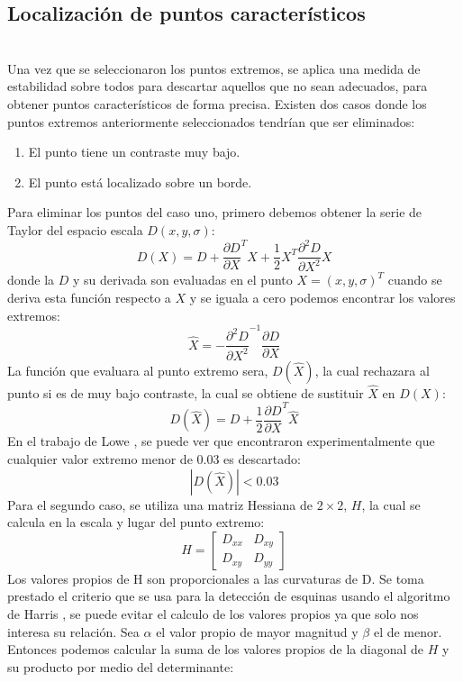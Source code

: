 	
	
	
	\subsection{Localización de puntos característicos} \hfill \\  %
		Una vez que se seleccionaron los puntos extremos, se aplica una medida de estabilidad sobre todos para descartar aquellos que no sean adecuados, para obtener puntos  característicos de forma precisa. Existen dos casos donde los puntos extremos anteriormente seleccionados tendrían que ser eliminados:
	\begin{enumerate}
		\item El punto tiene un contraste muy bajo.
		\item El punto está localizado sobre un borde.
	\end{enumerate}			
	Para eliminar los puntos del caso uno, primero debemos obtener la serie de Taylor del espacio escala $D(x,y,\sigma)$:
		$$D(X)=D +\frac{\partial D}{\partial X}^T X+ \frac{1}{2} X^T\frac{\partial^2 D}{\partial X^2} X $$
		donde la $D$ y su derivada son evaluadas en el punto $X = (x,y,\sigma)^T$ cuando se deriva esta función respecto a $X$ y se iguala a cero podemos encontrar los valores extremos: 
	    $$ \hat{X} = - \frac{\partial^2 D}{\partial X^2}^{-1}\frac{\partial D}{\partial X}$$
	 	La función que evaluara al punto extremo sera, $D(\hat{X})$, la cual rechazara al punto si es de muy bajo contraste, la cual se obtiene de sustituir $\hat{X}$ en $D(X)$:
	 	$$D(\hat{X})=D + \frac{1}{2} \frac{\partial D}{\partial X}^T \hat{X} $$ 	 
	 	En el trabajo de Lowe \cite{Lowe2004}, se  puede ver que encontraron experimentalmente que cualquier valor extremo menor de 0.03 es descartado:
	 	$$ |D(\hat{X})|< 0.03$$ 	 
	 	Para el segundo caso, se utiliza una matriz Hessiana de $2\times2$, $H$, la cual se calcula en la escala y lugar del punto extremo:
		$$ 
		H
		=
		\begin{bmatrix}
			D_{xx} & D_{xy}\\
    		D_{xy} & D_{yy}
		\end{bmatrix}		 	
		$$	
		Los valores propios de H son proporcionales a las curvaturas de D. Se toma prestado el criterio que se usa para la detección de esquinas usando el algoritmo de Harris \cite{Harris1988}, se puede evitar el calculo de los valores propios ya que solo nos interesa su relación. Sea $\alpha$ el valor propio de mayor magnitud y $\beta$ el de menor. Entonces podemos calcular la suma de los valores propios de la diagonal de $H$ y su producto por medio del determinante:
